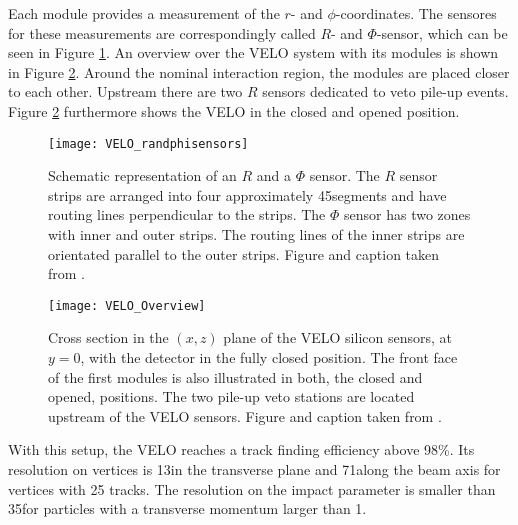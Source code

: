 Each module provides a measurement of the $r$- and $\phi$-coordinates.
The sensores for these measurements are correspondingly called $R$- and $\Phi$-sensor, which can be seen in Figure \ref{fig:VELO_RandPhiSensor}.
An overview over the VELO system with its modules is shown in Figure \ref{fig:VELO_Overview}. 
Around the nominal interaction region, the modules are placed closer to each other. 
Upstream there are two $R$ sensors dedicated to veto pile-up events. 
Figure \ref{fig:VELO_Overview} furthermore shows the VELO in the closed and opened position.
\begin{figure}[tb]
    \centering
	\texttt{[image: VELO\_randphisensors]}	
	\caption{Schematic representation of an $R$ and a $\Phi$ sensor. The $R$ sensor strips are arranged into four approximately 45\degrees segments and have routing lines perpendicular to the strips. The $\Phi$ sensor has two zones with inner and outer strips. The routing lines of the inner strips
    are orientated parallel to the outer strips. Figure and caption taken from \cite{VELO_Performance}.}
	\label{fig:VELO_RandPhiSensor}
\end{figure}
\begin{figure}[tb]
    \centering
	\texttt{[image: VELO\_Overview]}	
	\caption{Cross section in the $(x,z)$ plane of the VELO silicon sensors, at $y=0$, with the detector in the fully closed position. 
             The front face of the first modules is also illustrated in both, the closed and opened, positions. 
             The two pile-up veto stations are located upstream of the VELO sensors.
             Figure and caption taken from \cite{detector}.}
	\label{fig:VELO_Overview}
\end{figure}

With this setup, the VELO reaches a track finding efficiency above 98\%. 
Its resolution on vertices is 13\mum in the transverse plane and 71\mum along the beam axis for vertices with 25 tracks. 
The resolution on the impact parameter is smaller than 35\mum for particles with a transverse momentum larger than 1\gev \cite{detector, VELO_TDR, VELO_Performance}.

